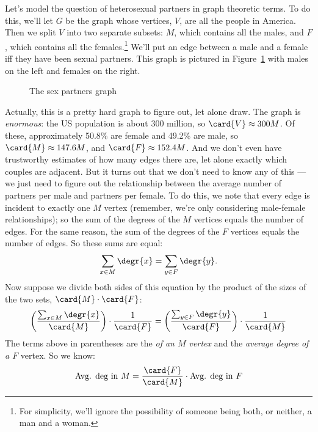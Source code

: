 
Let's model the question of heterosexual partners in graph theoretic terms.  To do
this, we'll let $G$ be the graph whose vertices, $V$, are all the people in America.
Then we split $V$ into two separate subsets: $M$, which contains all the males, and
$F$, which contains all the females.\footnote{For simplicity, we'll ignore the
possibility of someone being both, or neither, a man and a woman.}  We'll put an edge
between a male and a female iff they have been sexual partners.  This graph is pictured
in Figure~\ref{fig:partners} with males on the left and females on the right.

\begin{figure}
\caption{The sex partners graph}
\label{fig:partners}
\end{figure}

Actually, this is a pretty hard graph to figure out, let alone draw.
The graph is \emph{enormous}: the US population is about 300 million,
so $\card{V} \approx 300M$.  Of these, approximately 50.8\% are female
and 49.2\% are male, so $\card{M} \approx 147.6M$, and
$\card{F} \approx 152.4M$.  And we don't even have trustworthy
estimates of how many edges there are, let alone exactly which couples
are adjacent.  But it turns out that we don't need to know any of this
---we just need to figure out the relationship between the average
number of partners per male and partners per female.  To do this, we
note that every edge is incident to exactly one $M$ vertex (remember,
we're only considering male-female relationships); so the sum of the
degrees of the $M$ vertices equals the number of edges.  For the same
reason, the sum of the degrees of the $F$ vertices equals the number
of edges.  So these sums are equal:
%
\[
\sum_{x \in M} \degr{x} = \sum_{y \in F} \degr{y}.
\]
%
Now suppose we divide both sides of this equation by the product of the sizes of the
two sets, $\card{M} \cdot \card{F}$:
%
\[
\left(\frac{\sum_{x \in M} \degr{x}}{\card{M}}\right) \cdot \frac{1}{\card{F}} =
\left(\frac{\sum_{y \in F} \degr{y}}{\card{F}}\right) \cdot \frac{1}{\card{M}}
\]
%
The terms above in parentheses are the \emph{ of an $M$ vertex} and
  the \emph{average degree of a $F$} vertex.  So we know:
\[
\text{Avg. deg in $M$} = \frac{\card{F}}{\card{M}} \cdot \text{Avg. deg in $F$}
\]

